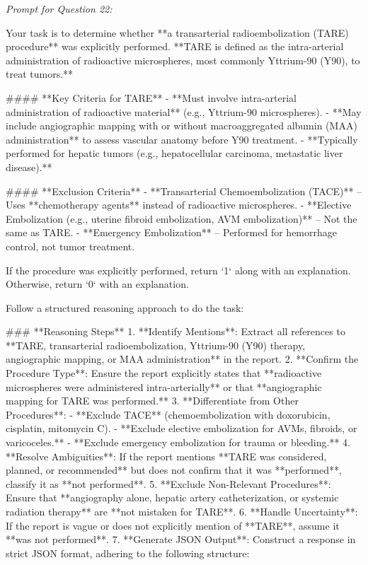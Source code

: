 \textit{\normalsize Prompt for Question  22:}
\begin{mdframed}[]
\normalsize

Your task is to determine whether **a transarterial radioembolization (TARE) procedure** was explicitly performed. **TARE is defined as the intra-arterial administration of radioactive microspheres, most commonly Yttrium-90 (Y90), to treat tumors.**  

#### **Key Criteria for TARE**  
- **Must involve intra-arterial administration of radioactive material** (e.g., Yttrium-90 microspheres).  
- **May include angiographic mapping with or without macroaggregated albumin (MAA) administration** to assess vascular anatomy before Y90 treatment.  
- **Typically performed for hepatic tumors (e.g., hepatocellular carcinoma, metastatic liver disease).**  

#### **Exclusion Criteria**  
- **Transarterial Chemoembolization (TACE)** – Uses **chemotherapy agents** instead of radioactive microspheres.  
- **Elective Embolization (e.g., uterine fibroid embolization, AVM embolization)** – Not the same as TARE.  
- **Emergency Embolization** – Performed for hemorrhage control, not tumor treatment.  

If the procedure was explicitly performed, return `1` along with an explanation. Otherwise, return `0` with an explanation.

Follow a structured reasoning approach to do the task:

### **Reasoning Steps**  
1. **Identify Mentions**: Extract all references to **TARE, transarterial radioembolization, Yttrium-90 (Y90) therapy, angiographic mapping, or MAA administration** in the report.  
2. **Confirm the Procedure Type**: Ensure the report explicitly states that **radioactive microspheres were administered intra-arterially** or that **angiographic mapping for TARE was performed.**  
3. **Differentiate from Other Procedures**:  
   - **Exclude TACE** (chemoembolization with doxorubicin, cisplatin, mitomycin C).  
   - **Exclude elective embolization for AVMs, fibroids, or varicoceles.**  
   - **Exclude emergency embolization for trauma or bleeding.**  
4. **Resolve Ambiguities**: If the report mentions **TARE was considered, planned, or recommended** but does not confirm that it was **performed**, classify it as **not performed**.  
5. **Exclude Non-Relevant Procedures**: Ensure that **angiography alone, hepatic artery catheterization, or systemic radiation therapy** are **not mistaken for TARE**.  
6. **Handle Uncertainty**: If the report is vague or does not explicitly mention of **TARE**, assume it **was not performed**.  
7. **Generate JSON Output**: Construct a response in strict JSON format, adhering to the following structure:  

\end{mdframed}

